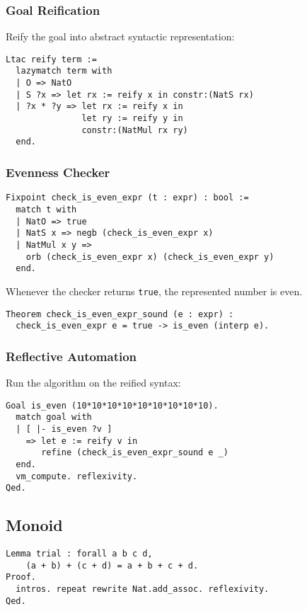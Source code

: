 \documentclass{beamer}
\begin{document}
\begin{frame}[fragile]
  \frametitle{Goal Reification}
  Reify the goal into abstract syntactic representation:
\begin{verbatim}
Ltac reify term :=
  lazymatch term with
  | O => NatO
  | S ?x => let rx := reify x in constr:(NatS rx)
  | ?x * ?y => let rx := reify x in
               let ry := reify y in
               constr:(NatMul rx ry)
  end.
\end{verbatim}
\end{frame}

\begin{frame}[fragile]
\frametitle{Evenness Checker}
\begin{verbatim}
Fixpoint check_is_even_expr (t : expr) : bool :=
  match t with
  | NatO => true
  | NatS x => negb (check_is_even_expr x)
  | NatMul x y =>
    orb (check_is_even_expr x) (check_is_even_expr y)
  end.
\end{verbatim}
  Whenever the checker returns \texttt{true}, the represented number is even.
\begin{verbatim}
Theorem check_is_even_expr_sound (e : expr) :
  check_is_even_expr e = true -> is_even (interp e).
\end{verbatim}
\end{frame}

\begin{frame}[fragile]
  \frametitle{Reflective Automation}
  Run the algorithm on the reified syntax:
\begin{verbatim}
Goal is_even (10*10*10*10*10*10*10*10*10).
  match goal with
  | [ |- is_even ?v ]
    => let e := reify v in
       refine (check_is_even_expr_sound e _)
  end.
  vm_compute. reflexivity.
Qed.
\end{verbatim}
\end{frame}

\begin{frame}
  \section{Monoid}
\end{frame}

\begin{frame}[fragile]
\begin{verbatim}
Lemma trial : forall a b c d,
    (a + b) + (c + d) = a + b + c + d.
Proof.
  intros. repeat rewrite Nat.add_assoc. reflexivity.
Qed.
\end{verbatim}
\end{frame}
\end{document}
